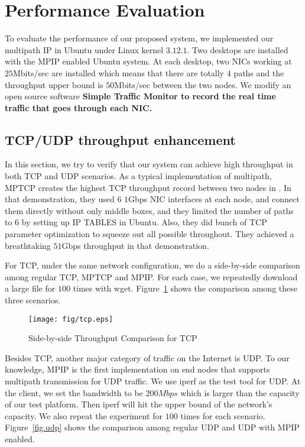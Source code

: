 \section{Performance Evaluation}
\label{sec:evaluation}
To evaluate the performance of our proposed system, we implemented our multipath IP in Ubuntu under Linux kernel $3.12.1$. Two desktops are installed with the MPIP enabled Ubuntu system. At each desktop, two NICs working at $25$Mbits/sec are installed which means that there are totally $4$ paths and the throughput upper bound is $50$Mbits/sec between the two nodes. We modify an open source software \bf{Simple Traffic Monitor}\cite{simon01} to record the real time traffic that goes through each NIC.


\subsection{TCP/UDP throughput enhancement}
\label{sec:tcp}

In this section, we try to verify that our system can achieve high throughput in both TCP and UDP scenarios. As a typical implementation of multipath, MPTCP creates the highest TCP throughput record between two nodes in \cite{record}. In that demonstration, they used $6$ $1$Gbps NIC interfaces at each node, and connect them directly without only middle boxes, and they limited the number of paths to $6$ by setting up IP TABLES in Ubuntu. Also, they did bunch of TCP parameter optimization to squeeze out all possible throughout. They achieved a breathtaking $51$Gbps throughput in that demonstration. 

For TCP, under the same network configuration, we do a side-by-side comparison among regular TCP, MPTCP and MPIP. For each case, we repeatedly download a large file for $100$ times with wget. Figure~\ref{fig.tcp} shows the comparison among these three scenarios.

\begin{figure}
\centering
\texttt{[image: fig/tcp.eps]}
\caption{Side-by-side Throughput Comparison for TCP}
\label{fig.tcp}
\end{figure}


Besides TCP, another major category of traffic on the Internet is UDP. To our knowledge, MPIP is the first implementation on end nodes that supports multipath transmission for UDP traffic. We use iperf as the test tool for UDP. At the client, we set the bandwidth to be $200Mbps$ which is larger than the capacity of our test platform. Then iperf will hit the upper bound of the network's capacity. We also repeat the experiment for $100$ times for each scenario. Figure~\ref{fig.udp} shows the comparison among regular UDP and UDP with MPIP enabled.

